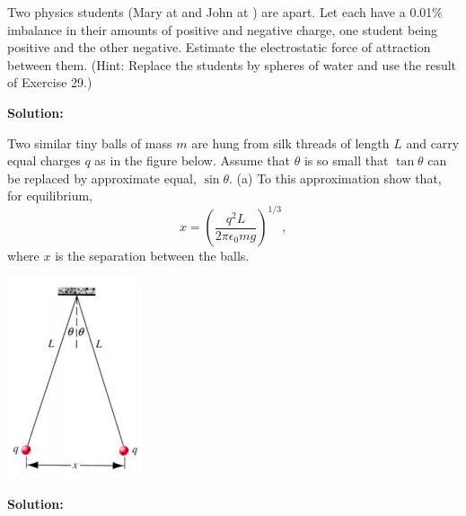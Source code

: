 \documentclass[11pt]{article}
\newcommand{\pn}[1]{\left( #1 \right)}
\begin{document}
\vspace*{0.25in}


\begin{problem}[(E25.30)]
Two physics students (Mary at  and John at ) are  apart. Let each have a 0.01\% imbalance in their
amounts of positive and negative charge, one student being positive and the other negative. Estimate the electrostatic force of attraction between them.
(Hint: Replace the students by spheres of water and use the result of Exercise 29.)
\end{problem}


\textbf{Solution:}


\clearpage
\begin{problem}[(P25.4(a))*]
Two similar tiny balls of mass $m$ are hung from silk threads of length $L$ and carry equal charges $q$ as in the figure below. Assume that
$\theta$ is so small that $\tan\theta$ can be replaced by approximate equal, $\sin\theta$. (a) To this approximation show that, for equilibrium,
$$
	x = \pn{\frac{q^2L}{2\pi\epsilon_0mg}}^{1/3},
$$
where $x$ is the separation between the balls.
\begin{center}
\includegraphics[scale=0.6]{prob2.png}
\end{center}
\end{problem}


\textbf{Solution:}

\end{document}
